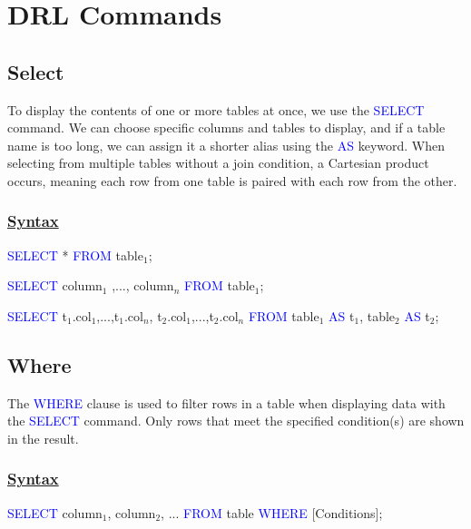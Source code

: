 \section{DRL Commands}
\subsection{Select}


\begin{tcolorbox}[title = Definition]
To display the contents of one or more tables at once, we use the \textcolor{blue}{SELECT} command. We can choose specific columns and tables to display, and if a table name is too long, we can assign it a shorter alias using the \textcolor{blue}{AS} keyword. When selecting from multiple tables without a join condition, a Cartesian product occurs, meaning each row from one table is paired with each row from the other.
\end{tcolorbox}

\subsubsection*{\underline{Syntax}}
\begin{tcolorbox}[title = Table Selection]
\textcolor{blue}{SELECT} * \textcolor{blue}{FROM} table$_{1}$;

\textcolor{blue}{SELECT} column$_{1}$ ,..., column$_{n}$ \textcolor{blue}{FROM} table$_{1}$;

\textcolor{blue}{SELECT} t$_{1}$.col$_{1}$,...,t$_{1}$.col$_{n}$, t$_{2}$.col$_{1}$,...,t$_{2}$.col$_{n}$ \textcolor{blue}{FROM} table$_{1}$ \textcolor{blue}{AS} t$_{1}$, table$_{2}$ \textcolor{blue}{AS} t$_{2}$;
\end{tcolorbox}
\subsection{Where}
\begin{tcolorbox}[title = Definition]
The \textcolor{blue}{WHERE} clause is used to filter rows in a table when displaying data with the
\textcolor{blue}{SELECT} command. Only rows that meet the specified condition(s) are shown in the result.
\end{tcolorbox}
\subsubsection*{\underline{Syntax}}
\begin{tcolorbox}[title = Where Clause]
 \textcolor{blue}{SELECT} column$_{1}$, column$_{2}$, ... \textcolor{blue}{FROM} table \textcolor{blue}{WHERE} {[Conditions]};
\end{tcolorbox}

